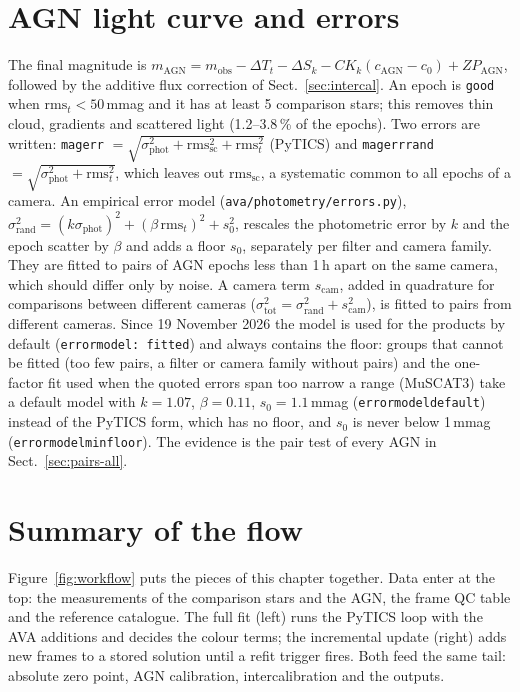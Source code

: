 \documentclass[10pt,a4paper,oneside]{report}
\renewcommand{\_}{\oldunderscore\allowbreak}
\begin{document}
\section{AGN light curve and errors}
\label{sec:agnlc}

The final magnitude is
$m_\mathrm{AGN} = m_\mathrm{obs} - \Delta T_t - \Delta S_k - CK_k(c_\mathrm{AGN}-c_0) + ZP_\mathrm{AGN}$,
followed by the additive flux correction of Sect.~\ref{sec:intercal}. An epoch is \texttt{good} when
$\mathrm{rms}_t < 50$\,mmag and it has at least 5 comparison stars; this removes thin cloud, gradients
and scattered light (1.2--3.8\,\% of the epochs). Two errors are written: \texttt{mag\_err}
$=\sqrt{\sigma_\mathrm{phot}^2+\mathrm{rms}_\mathrm{sc}^2+\mathrm{rms}_t^2}$ (PyTICS) and
\texttt{mag\_err\_rand} $=\sqrt{\sigma_\mathrm{phot}^2+\mathrm{rms}_t^2}$, which leaves out
$\mathrm{rms}_\mathrm{sc}$, a systematic common to all epochs of a camera. An empirical error model
(\texttt{ava/photometry/errors.py}),
$\sigma_\mathrm{rand}^2 = (k\sigma_\mathrm{phot})^2 + (\beta\,\mathrm{rms}_t)^2 + s_0^2$, rescales the
photometric error by $k$ and the epoch scatter by $\beta$ and adds a floor $s_0$, separately per filter
and camera family. They are fitted to pairs of AGN epochs less than 1\,h apart on the same camera, which
should differ only by noise. A camera term $s_\mathrm{cam}$, added in quadrature for comparisons between
different cameras ($\sigma_\mathrm{tot}^2=\sigma_\mathrm{rand}^2+s_\mathrm{cam}^2$), is fitted to pairs
from different cameras. Since 19 November 2026 the model is used for the products by default
(\texttt{error\_model: fitted}) and always contains the floor: groups that cannot be fitted (too few pairs,
a filter or camera family without pairs) and the one-factor fit used when the quoted errors span too narrow a
range (MuSCAT3) take a default model with $k=1.07$, $\beta=0.11$, $s_0=1.1$\,mmag
(\texttt{error\_model\_default}) instead of the PyTICS form, which has no floor, and $s_0$ is never below
1\,mmag (\texttt{error\_model\_min\_floor}). The evidence is the pair test of every AGN in
Sect.~\ref{sec:pairs-all}.

\section{Summary of the flow}

Figure~\ref{fig:workflow} puts the pieces of this chapter together. Data enter at the top: the
measurements of the comparison stars and the AGN, the frame QC table and the reference catalogue. The
full fit (left) runs the PyTICS loop with the AVA additions and decides the colour terms; the incremental
update (right) adds new frames to a stored solution until a refit trigger fires. Both feed the same tail:
absolute zero point, AGN calibration, intercalibration and the outputs.
\end{document}
